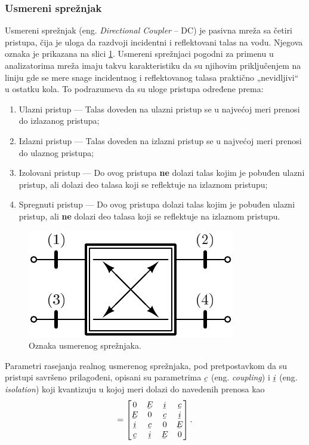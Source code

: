 \documentclass[a4paper, 12pt, diplomski]{etf}
\newcommand{\faz}[1]{\underaccent{\bar}{#1}}
\begin{document}
\subsubsection{Usmereni sprežnjak \label{ss:dc}}
Usmereni sprežnjak (eng. \textit{Directional Coupler} -- DC) je 
pasivna mreža sa četiri pristupa, čija je uloga da razdvoji incidentni
i reflektovani talas na vodu.
Njegova oznaka je prikazana na slici \ref{fig:dc}.
Usmereni sprežnjaci pogodni za primenu u 
analizatorima mreža imaju takvu karakteristiku
da su njihovim priključenjem na liniju gde se 
mere snage incidentnog i reflektovanog talasa 
praktično „nevidljivi“ u ostatku kola. 
To podrazumeva da su
uloge pristupa određene prema:
\begin{enumerate}
    \item Ulazni pristup --- Talas doveden na ulazni pristup se u 
    najvećoj meri prenosi do izlazanog pristupa;
    \item Izlazni pristup --- Talas doveden na izlazni pristup se 
    u najvećoj meri prenosi do ulaznog pristupa;
    \item Izolovani pristup --- Do ovog pristupa \textbf{ne} dolazi talas
    kojim je pobuđen ulazni pristup, ali dolazi deo 
    talasa koji se reflektuje na
    izlaznom pristupu;
    \item Spregnuti pristup --- Do ovog pristupa dolazi talas
    kojim je pobuđen ulazni pristup, ali \textbf{ne} dolazi deo talasa koji se reflektuje na
    izlaznom pristupu.
\end{enumerate}
%
\begin{figure}[t!]
    \centering
    \includegraphics{fig/dc.pdf}
    \caption{Oznaka usmerenog sprežnjaka.}
    \label{fig:dc}
\end{figure}
%
Parametri rasejanja realnog usmerenog sprežnjaka, pod pretpostavkom 
da su pristupi savršeno prilagođeni, 
opisani su parametrima $\faz c$ (eng. \textit{coupling}) i $\faz i$ (eng. 
\textit{isolation}) koji kvantizuju u kojoj meri dolazi
do navedenih prenosa kao
\begin{equation}
    [{\bf \faz S}] = 
    \begin{bmatrix}
    0 & \faz E & \faz i & \faz c\\ 
    \faz E & 0 & \faz c & \faz i \\
    \faz i & \faz c & 0 & \faz E \\
    \faz c & \faz i & \faz E & 0 \\
    \end{bmatrix}. 
\end{equation}
\end{document}
